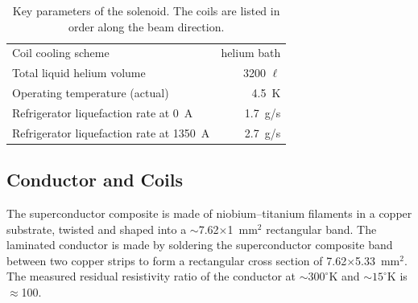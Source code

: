 \begin{table}[thp]
\begin{center}
\begin{tabular}{lr}
       Coil cooling scheme             & helium bath \\   
       Total liquid helium volume      & 3200 $\ell$ \\
       Operating temperature (actual)  &  4.5~K \\   
       Refrigerator liquefaction rate at 0~A        & 1.7~g/s    \\
       Refrigerator liquefaction rate at 1350~A     & 2.7~g/s    \\
     \hline
   \end{tabular}
   \normalsize
 \end{center}
  \caption{
    Key parameters of the \gx{} solenoid. The
    coils are listed in order along the beam direction.
    \label{tab:sol:summary}
  }
\end{table}


\subsection[Conductor and Coils]{Conductor and Coils
 \label{sec:sol:coils}
}

The superconductor composite is made of niobium--titanium filaments
in a copper substrate, twisted and shaped into a
$\sim$7.62$\times$1~mm$^2$ rectangular band. The laminated conductor
is made by soldering the superconductor composite band between two
copper strips
to form a rectangular cross section of 7.62$\times$5.33~mm$^2$.
The measured residual resistivity ratio of the conductor at $\sim{}300^\circ{}$K and
$\sim{}15^\circ{}$K is $\approx{}$100.  

